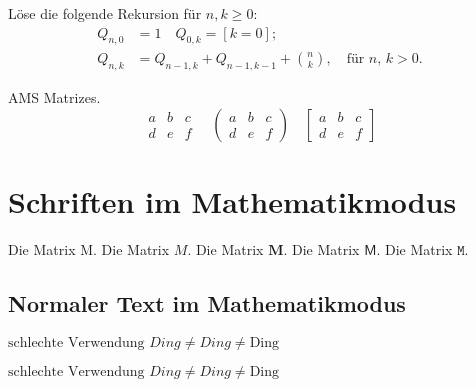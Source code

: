 \documentclass{article}
\begin{document}
Löse die folgende Rekursion für $ n,k\geq 0 $:
\begin{align*}
    Q_{n,0} & = 1   \quad Q_{0,k} = [k=0];                                      \\
    Q_{n,k} & = Q_{n-1,k}+Q_{n-1,k-1}+\binom{n}{k}, \quad\text{für $n$, $k>0$.}
\end{align*}


AMS Matrizes.
\[
    \begin{matrix}
        a & b & c \\
        d & e & f
    \end{matrix}
    \quad
    \begin{pmatrix}
        a & b & c \\
        d & e & f
    \end{pmatrix}
    \quad
    \begin{bmatrix}
        a & b & c \\
        d & e & f
    \end{bmatrix}
\]


\section{Schriften im Mathematikmodus}

Die Matrix $\mathrm{M}$.
Die Matrix $\mathit{M}$.
Die Matrix $\mathbf{M}$.
Die Matrix $\mathsf{M}$.
Die Matrix $\mathtt{M}$.

\subsection{Normaler Text im Mathematikmodus}

$\text{schlechte Verwendung } Ding  \neq \mathit{Ding} \neq \mathrm{Ding} $

\textit{$\text{schlechte Verwendung } Ding \neq \mathit{Ding} \neq \mathrm{Ding} $}
\end{document}
